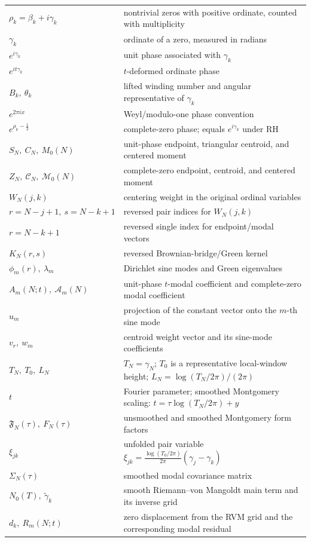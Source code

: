 \documentclass[11pt]{amsart}
\numberwithin{equation}{section}
\theoremstyle{plain}
\theoremstyle{definition}
\theoremstyle{remark}
\begin{document}
\begin{center}
\begin{tabular}{p{}p{}}
\(\rho_k=\beta_k+i\gamma_k\)
&
nontrivial zeros with positive ordinate, counted with multiplicity
\\
\(\gamma_k\)
&
ordinate of a zero, measured in radians
\\
\(e^{i\gamma_k}\)
&
unit phase associated with \(\gamma_k\)
\\
\(e^{it\gamma_k}\)
&
\(t\)-deformed ordinate phase
\\
\(B_k,\ \theta_k\)
&
lifted winding number and angular representative of \(\gamma_k\)
\\
\(e^{2\pi i x}\)
&
Weyl/modulo-one phase convention
\\
\(e^{\rho_k-\frac12}\)
&
complete-zero phase; equals \(e^{i\gamma_k}\) under RH
\\
\(S_N,\ C_N,\ M_0(N)\)
&
unit-phase endpoint, triangular centroid, and centered moment
\\
\(Z_N,\ \mathcal C_N,\ \mathcal M_0(N)\)
&
complete-zero endpoint, centroid, and centered moment
\\
\(W_N(j,k)\)
&
centering weight in the original ordinal variables
\\
\(r=N-j+1,\ s=N-k+1\)
&
reversed pair indices for \(W_N(j,k)\)
\\
\(r=N-k+1\)
&
reversed single index for endpoint/modal vectors
\\
\(K_N(r,s)\)
&
reversed Brownian-bridge/Green kernel
\\
\(\phi_m(r),\ \lambda_m\)
&
Dirichlet sine modes and Green eigenvalues
\\
\(A_m(N;t),\ \mathcal A_m(N)\)
&
unit-phase \(t\)-modal coefficient and complete-zero modal coefficient
\\
\(u_m\)
&
projection of the constant vector onto the \(m\)-th sine mode
\\
\(v_r,\ w_m\)
&
centroid weight vector and its sine-mode coefficients
\\
\(T_N,\ T_0,\ L_N\)
&
\(T_N=\gamma_N\); \(T_0\) is a representative local-window height; \(L_N=\log(T_N/2\pi)/(2\pi)\)
\\
\(t\)
&
Fourier parameter; smoothed Montgomery scaling:
\(t=\tau\log(T_N/2\pi)+y\)
\\
\(\mathfrak F_N(\tau),\ F_N(\tau)\)
&
unsmoothed and smoothed Montgomery form factors
\\
\(\xi_{jk}\)
&
unfolded pair variable \(\xi_{jk}=\frac{\log(T_0/2\pi)}{2\pi}(\gamma_j-\gamma_k)\)
\\
\(\Sigma_N(\tau)\)
&
smoothed modal covariance matrix
\\
\(N_0(T),\ \widetilde\gamma_k\)
&
smooth Riemann--von Mangoldt main term and its inverse grid
\\
\(d_k,\ R_m(N;t)\)
&
zero displacement from the RVM grid and the corresponding modal residual
\end{tabular}
\end{center}
\end{document}
